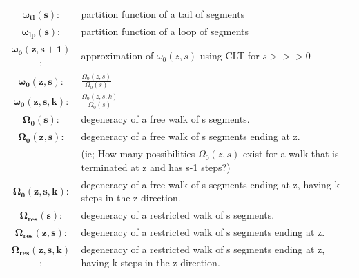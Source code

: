 \documentclass[10pt,letterpaper]{article}
\begin{document}
\begin{tabular}{c|l}
$\mathbf{\omega_{tl}(s)}$:&partition function of a tail of segments\\
$\mathbf{\omega_{lp}(s)}$:&partition function of a loop of segments\\
$\mathbf{\omega_0(z,s+1)}$:&approximation of $\omega_0(z,s)$ using CLT for $s>>>0$ \\
$\mathbf{\omega_{0}(z,s)}$:& $\frac{\Omega_0(z,s)}{\Omega_0(s)}$\\
$\mathbf{\omega_{0}(z,s,k)}$:& $\frac{\Omega_0(z,s,k)}{\Omega_0(s)}$\\
$\mathbf{\Omega_{0}(s)}$:& degeneracy of a free walk of s segments.\\
$\mathbf{\Omega_{0}(z,s)}$:&degeneracy of a free walk of s segments ending at z.\\
&(ie; How many possibilities $\Omega_{0}(z,s)$ exist for a walk that is terminated at z and has s-1 steps?)\\
$\mathbf{\Omega_{0}(z,s,k)}$: & degeneracy of a free walk of s segments ending at z, having k steps in the z direction.\\
$\mathbf{\Omega_{res}(s)}$:&degeneracy of a restricted walk of s segments.\\
$\mathbf{\Omega_{res}(z,s)}$:&degeneracy of a restricted walk of s segments ending at z.\\
$\mathbf{\Omega_{res}(z,s,k)}$:&degeneracy of a restricted walk of s segments ending at z, having k steps in the z direction.\\
\hline
\end{tabular} 
		
		
		
\end{document}
